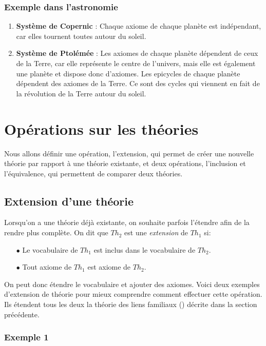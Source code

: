 {\subsubsection{Exemple dans l'astronomie}
\begin {enumerate}
\item {\textbf{Système de Copernic}} : Chaque axiome de chaque planète est indépendant, car elles tournent toutes autour du soleil.
\item{\textbf{Système de Ptolémée}} : Les axiomes de chaque planète dépendent de ceux de la Terre, car elle représente le centre de l'univers, mais elle est également une planète et dispose donc d'axiomes. Les epicycles de chaque planète dépendent	des axiomes de la Terre. Ce sont des cycles qui viennent en fait de la révolution de la Terre autour du soleil.
\end {enumerate}

\section{Opérations sur les théories}

Nous allons définir une opération, l'extension, qui permet de créer une nouvelle théorie par rapport à une théorie existante,
et deux opérations, l'inclusion et l'équivalence, qui permettent de comparer deux théories.

\subsection{Extension d'une théorie}
Lorsqu'on a une théorie déjà existante, on souhaite parfois l'étendre afin de la rendre plus complète.
On dit que $Th_2$ est une {\em extension} de $Th_1$ si:
\begin{itemize}
\item[$\bullet$] Le vocabulaire de $Th_1$ est inclus dans le vocabulaire de $Th_2$.
\item[$\bullet$] Tout axiome de $Th_1$ est axiome de $Th_2$.
\end{itemize}
On peut donc étendre le vocabulaire et ajouter des axiomes.
Voici deux exemples d'extension de théorie pour mieux comprendre comment effectuer cette opération. Ils étendent tous les deux
la théorie des liens familiaux () décrite dans la section précédente.

\subsubsection{Exemple 1}

}
